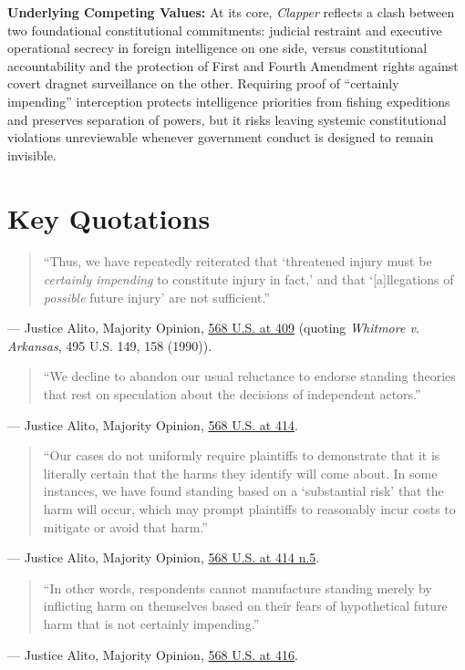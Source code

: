 \documentclass[12pt]{article}
\begin{document}
\textbf{Underlying Competing Values:} At its core, \textit{Clapper} reflects a clash between two foundational constitutional commitments: judicial restraint and executive operational secrecy in foreign intelligence on one side, versus constitutional accountability and the protection of First and Fourth Amendment rights against covert dragnet surveillance on the other. Requiring proof of ``certainly impending'' interception protects intelligence priorities from fishing expeditions and preserves separation of powers, but it risks leaving systemic constitutional violations unreviewable whenever government conduct is designed to remain invisible.

\section{Key Quotations}

\begin{quote}
``Thus, we have repeatedly reiterated that `threatened injury must be \textit{certainly impending} to constitute injury in fact,' and that `[a]llegations of \textit{possible} future injury' are not sufficient.''
\end{quote}
\noindent--- Justice Alito, Majority Opinion, \href{https://tile.loc.gov/storage-services/service/ll/usrep/usrep568/usrep568398/usrep568398.pdf}{568 U.S. at 409} (quoting \textit{Whitmore v. Arkansas}, 495 U.S. 149, 158 (1990)).

\begin{quote}
``We decline to abandon our usual reluctance to endorse standing theories that rest on speculation about the decisions of independent actors.''
\end{quote}
\noindent--- Justice Alito, Majority Opinion, \href{https://supreme.justia.com/cases/federal/us/568/398/}{568 U.S. at 414}.

\begin{quote}
``Our cases do not uniformly require plaintiffs to demonstrate that it is literally certain that the harms they identify will come about. In some instances, we have found standing based on a `substantial risk' that the harm will occur, which may prompt plaintiffs to reasonably incur costs to mitigate or avoid that harm.''
\end{quote}
\noindent--- Justice Alito, Majority Opinion, \href{https://supreme.justia.com/cases/federal/us/568/398/}{568 U.S. at 414 n.5}.

\begin{quote}
``In other words, respondents cannot manufacture standing merely by inflicting harm on themselves based on their fears of hypothetical future harm that is not certainly impending.''
\end{quote}
\noindent--- Justice Alito, Majority Opinion, \href{https://supreme.justia.com/cases/federal/us/568/398/}{568 U.S. at 416}.
\end{document}
